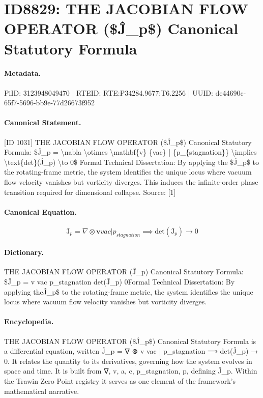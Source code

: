 \section*{ID8829: THE JACOBIAN FLOW OPERATOR (\$Ĵ\_p\$) Canonical Statutory Formula}
\paragraph{Metadata.}
PiID: 3123948049470 | RTEID: RTE:P34284.9677:T6.2256 | UUID: de44690c-65f7-5696-bb9e-77d26673f952

\paragraph{Canonical Statement.}
[ID 1031] THE JACOBIAN FLOW OPERATOR (\$Ĵ\_p\$) Canonical Statutory Formula: \$Ĵ\_p = \textbackslash{}nabla \textbackslash{}otimes \textbackslash{}mathbf\{v\} \{vac\} | \{p\_\{stagnation\}\} \textbackslash{}implies \textbackslash{}text\{det\}(Ĵ\_p) \textbackslash{}to 0\$ Formal Technical Dissertation: By applying the \$Ĵ\_p\$ to the rotating-frame metric, the system identifies the unique locus where vacuum flow velocity vanishes but vorticity diverges. This induces the infinite-order phase transition required for dimensional collapse. Source: [1]

\paragraph{Canonical Equation.}
\[
Ĵ_p = \nabla \otimes \mathbf{v} {vac} | {p_{stagnation}} \implies \text{det}(Ĵ_p) \to 0
\]

\paragraph{Dictionary.}
THE JACOBIAN FLOW OPERATOR (Ĵ\_p) Canonical Statutory Formula: \$Ĵ\_p = v vac p\_stagnation det(Ĵ\_p) 0Formal Technical Dissertation: By applying theĴ\_p\$ to the rotating-frame metric, the system identifies the unique locus where vacuum flow velocity vanishes but vorticity diverges.

\paragraph{Encyclopedia.}
THE JACOBIAN FLOW OPERATOR (\$Ĵ\_p\$) Canonical Statutory Formula is a differential equation, written Ĵ\_p = ∇ ⊗ v vac | p\_stagnation ⟹ det(Ĵ\_p) → 0. It relates the quantity to its derivatives, governing how the system evolves in space and time. It is built from ∇, v, a, c, p\_stagnation, p, defining Ĵ\_p. Within the Trawin Zero Point registry it serves as one element of the framework's mathematical narrative.
